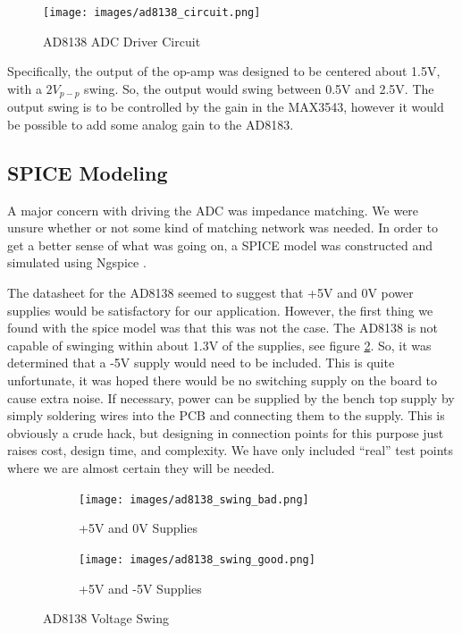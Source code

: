 \documentclass[a4paper, 12pt, notitlepage]{article}
\begin{document}
\begin{figure}[ht]
  \centering
  \caption{AD8138 ADC Driver Circuit}
  \label{fig:ad8138_circuit}
  \texttt{[image: images/ad8138\_circuit.png]}
\end{figure}

Specifically, the output of the op-amp was designed to be centered about 1.5V, with a $2V_{p-p}$ swing.  So, the output would swing between 0.5V and 2.5V.  The output swing is to be controlled by the gain in the MAX3543, however it would be possible to add some analog gain to the AD8183.

\subsection{SPICE Modeling}
A major concern with driving the ADC was impedance matching.  We were unsure whether or not some kind of matching network was needed.  In order to get a better sense of what was going on, a SPICE model was constructed and simulated using Ngspice \cite{ngspice}.

The datasheet for the AD8138 seemed to suggest that +5V and 0V power supplies would be satisfactory for our application.  However, the first thing we found with the spice model was that this was not the case.  The AD8138 is not capable of swinging within about 1.3V of the supplies, see figure \ref{fig:ad8138_swing_bad}.  So, it was determined that a -5V supply would need to be included.  This is quite unfortunate, it was hoped there would be no switching supply on the board to cause extra noise.  If necessary, power can be supplied by the bench top supply by simply soldering wires into the PCB and connecting them to the supply.  This is obviously a crude hack, but designing in connection points for this purpose just raises cost, design time, and complexity.  We have only included ``real'' test points where we are almost certain they will be needed.

\begin{figure}[ht]
\centering
\begin{subfigure}[b]{0.45\textwidth}
  \texttt{[image: images/ad8138\_swing\_bad.png]}
  \caption{+5V and 0V Supplies}
  \label{fig:ad8138_swing_bad}
\end{subfigure}
\begin{subfigure}[b]{0.45\textwidth}  
  \texttt{[image: images/ad8138\_swing\_good.png]}
  \caption{+5V and -5V Supplies}
  \label{fig:ad8138_swing_good}
\end{subfigure}

\caption{AD8138 Voltage Swing}
\label{fig:ad8138_swing}
\end{figure}
\end{document}
